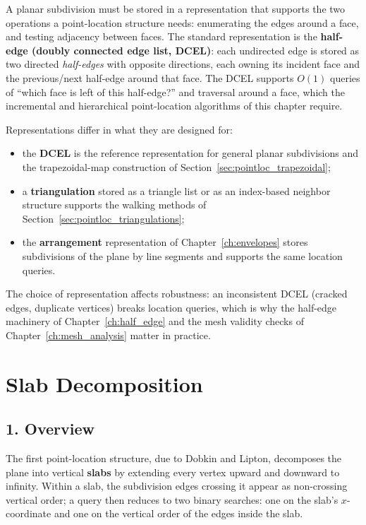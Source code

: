 A planar subdivision must be stored in a representation that supports the
two operations a point-location structure needs: enumerating the edges
around a face, and testing adjacency between faces. The standard
representation is the \textbf{half-edge (doubly connected edge list,
DCEL)}: each undirected edge is stored as two directed
\emph{half-edges} with opposite directions, each owning its incident face
and the previous/next half-edge around that face. The DCEL supports $O(1)$
queries of ``which face is left of this half-edge?'' and traversal around a
face, which the incremental and hierarchical point-location algorithms of
this chapter require.

Representations differ in what they are designed for:
\begin{itemize}
  \item the \textbf{DCEL} is the reference representation for general
    planar subdivisions and the trapezoidal-map construction of
    Section~\ref{sec:pointloc_trapezoidal};
  \item a \textbf{triangulation} stored as a triangle list or as an
    index-based neighbor structure supports the walking methods of
    Section~\ref{sec:pointloc_triangulations};
  \item the \textbf{arrangement} representation of Chapter~\ref{ch:envelopes}
    stores subdivisions of the plane by line segments and supports the same
    location queries.
\end{itemize}
The choice of representation affects robustness: an inconsistent DCEL
(cracked edges, duplicate vertices) breaks location queries, which is why
the half-edge machinery of Chapter~\ref{ch:half_edge} and the mesh
validity checks of Chapter~\ref{ch:mesh_analysis} matter in practice.


\section{Slab Decomposition}
\label{sec:pointloc_slabs}

\subsection{1. Overview}

The first point-location structure, due to Dobkin and Lipton, decomposes
the plane into vertical \textbf{slabs} by
extending every vertex upward and downward to infinity. Within a slab, the
subdivision edges crossing it appear as non-crossing vertical order; a query
then reduces to two binary searches: one on the slab's $x$-coordinate and
one on the vertical order of the edges inside the slab.

